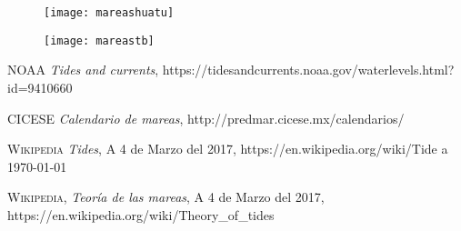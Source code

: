 \documentclass[12pt]{article}
\begin{document}
\begin{figure}[ht]
\texttt{[image: mareashuatu]}
\centering
\end{figure}

\begin{figure}[ht]
\texttt{[image: mareastb]}
\centering
\end{figure}

\newpage 



\newpage


\begin{thebibliography}{}

 \textsc{NOAA}
\textit{Tides and currents}, https://tidesandcurrents.noaa.gov/waterlevels.html?id=9410660 

 \textsc{CICESE}
\textit{Calendario de mareas}, http://predmar.cicese.mx/calendarios/


 \textsc{Wikipedia}
\textit{Tides}, A 4 de Marzo del 2017, https://en.wikipedia.org/wiki/Tide a \today


 \textsc{Wikipedia},
\textit{Teoría de las mareas}, A 4 de Marzo del 2017, https://en.wikipedia.org/wiki/Theory\_of\_tides 


\end{thebibliography}
\end{document}
